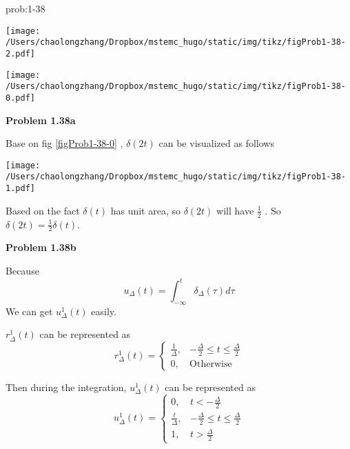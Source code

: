 \documentclass[koma,a4paper,utopia,12pt,listings-color,microtype,paralist,colorlinks,urlcolor=red]{org-article}
\begin{document}
\begin{prob}[]{prob:1-38}
\begin{enumerate}
\begin{center}
\texttt{[image: /Users/chaolongzhang/Dropbox/mstemc\_hugo/static/img/tikz/figProb1-38-2.pdf]}
\end{center}
\end{enumerate}
\label{prob:1-38}
\end{prob}

\begin{center}
\texttt{[image: /Users/chaolongzhang/Dropbox/mstemc\_hugo/static/img/tikz/figProb1-38-0.pdf]}
\label{figProb1-38-0}
\end{center}

\textbf{Problem 1.38a}

Base on fig \ref{figProb1-38-0} , \(\delta(2t)\) can be visualized as follows

\begin{center}
\texttt{[image: /Users/chaolongzhang/Dropbox/mstemc\_hugo/static/img/tikz/figProb1-38-1.pdf]}
\end{center}

Based on the fact \(\delta(t)\) has unit area, so \(\delta(2t)\) will have
\(\frac{1}{2}\) . So \(\delta(2t) = \frac{1}{2}\delta(t)\).

\textbf{Problem 1.38b}

Because
\begin{equation*}
u_{\Delta}(t) = \int_{-\infty}^{t}\delta_{\Delta}(\tau)d\tau
\end{equation*}
We can get \(u_{\Delta}^{1}(t)\) easily.


\(r_{\Delta}^{1}(t)\) can be represented as
\begin{equation*}
r_{\Delta}^{1}(t) =
\begin{cases}
\frac{1}{\Delta}, & -\frac{\Delta}{2} \leq t \leq \frac{\Delta}{2} \\
               0, & \mathrm{Otherwise}
\end{cases}
\end{equation*}

Then during the integration, \(u_{\Delta}^{1}(t)\) can be represented as
\begin{equation*}
u_{\Delta}^{1}(t) =
\begin{cases}
0, &  t < -\frac{\Delta}{2} \\
\frac{t}{\Delta}, & -\frac{\Delta}{2} \leq t \leq \frac{\Delta}{2} \\
1, & t > \frac{\Delta}{2}
\end{cases}

\end{equation*}
\end{document}
